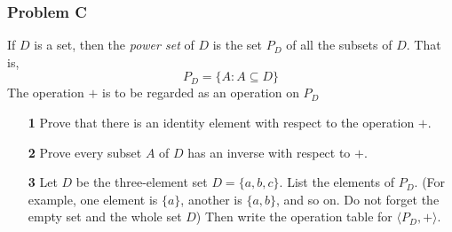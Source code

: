 \documentclass[11pt]{article}
\begin{document}
	\subsubsection*{Problem C}
	If $D$ is a set, then the \textit{power set} of $D$ is the set $P_D$ of all the subsets of $D$. That is,
	\begin{equation*}
    	P_D = \{A:A \subseteq D\}
	\end{equation*}
	The operation $+$ is to be regarded as an operation on $P_D$
	\begin{itemize}
		\item [\textbf{1}] Prove that there is an identity element with respect to the operation $+$.
		\item [\textbf{2}] Prove every subset $A$ of $D$ has an inverse with respect to $+$.
		\item [\textbf{3}] Let $D$ be the three-element set $D=\{a,b,c\}$. List the elements of $P_D$. (For example, one element is $\{a\}$, another is $\{a,b\}$, and so on. Do not forget the empty set and the whole set $D$) Then write the operation table for $\langle P_D, +\rangle$.
	\end{itemize}
\end{document}
